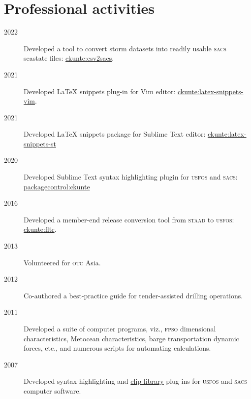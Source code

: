 \section*{Professional activities} %
\label{sec:prof_activities}

\begin{description}
\item[2022]Developed a tool to convert storm datasets into readily usable \textsc{sacs} seastate files: \href{https://github.com/ckunte/csv2sacs}{ckunte:csv2sacs}.

\item[2021]Developed {\LaTeX} snippets plug-in for Vim editor: \href{https://github.com/ckunte/latex-snippets-vim}{ckunte:latex-snippets-vim}.

\item[2021]Developed {\LaTeX} snippets package for Sublime Text editor: \href{https://github.com/ckunte/latex-snippets-st}{ckunte:latex-snippets-st}

\item[2020]Developed Sublime Text syntax highlighting plugin for \textsc{usfos} and \textsc{sacs}: \href{https://packagecontrol.io/browse/authors/ckunte}{packagecontrol:ckunte}

\item[2016]Developed a member-end release conversion tool from \textsc{staad} to \textsc{usfos}: \href{https://gist.github.com/ckunte/98fc79713b8d111b0aa6fec792b194b3}{ckunte:fltr}.

\item[2013]Volunteered for \textsc{otc} Asia.

\item[2012]Co-authored a best-practice guide for tender-assisted drilling operations.

\item[2011]Developed a suite of computer programs, viz., \textsc{fpso} dimensional characteristics, Metocean characteristics, barge transportation dynamic forces, etc., and numerous scripts for automating calculations.


\item[2007]Developed syntax-highlighting and \href{https://www.textpad.com/addons/cliplibs}{clip-library} plug-ins for \textsc{usfos} and \textsc{sacs} computer software.

\end{description}

